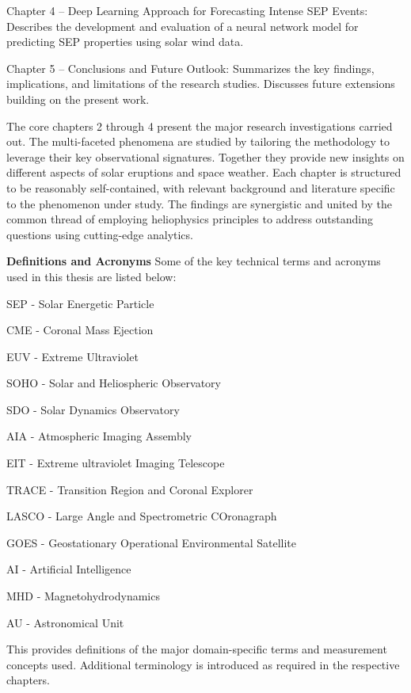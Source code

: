 Chapter 4 – Deep Learning Approach for Forecasting Intense SEP Events: Describes the development and evaluation of a neural network model for predicting SEP properties using solar wind data.

Chapter 5 – Conclusions and Future Outlook: Summarizes the key findings, implications, and limitations of the research studies. Discusses future extensions building on the present work.

The core chapters 2 through 4 present the major research investigations carried out. The multi-faceted phenomena are studied by tailoring the methodology to leverage their key observational signatures. Together they provide new insights on different aspects of solar eruptions and space weather. Each chapter is structured to be reasonably self-contained, with relevant background and literature specific to the phenomenon under study. The findings are synergistic and united by the common thread of employing heliophysics principles to address outstanding questions using cutting-edge analytics.

\textbf{Definitions and Acronyms}
Some of the key technical terms and acronyms used in this thesis are listed below:

SEP - Solar Energetic Particle

CME - Coronal Mass Ejection 

EUV - Extreme Ultraviolet

SOHO - Solar and Heliospheric Observatory

SDO - Solar Dynamics Observatory

AIA - Atmospheric Imaging Assembly 

EIT - Extreme ultraviolet Imaging Telescope

TRACE - Transition Region and Coronal Explorer

LASCO - Large Angle and Spectrometric COronagraph

GOES - Geostationary Operational Environmental Satellite

AI - Artificial Intelligence

MHD - Magnetohydrodynamics

AU - Astronomical Unit

This provides definitions of the major domain-specific terms and measurement concepts used. Additional terminology is introduced as required in the respective chapters.
